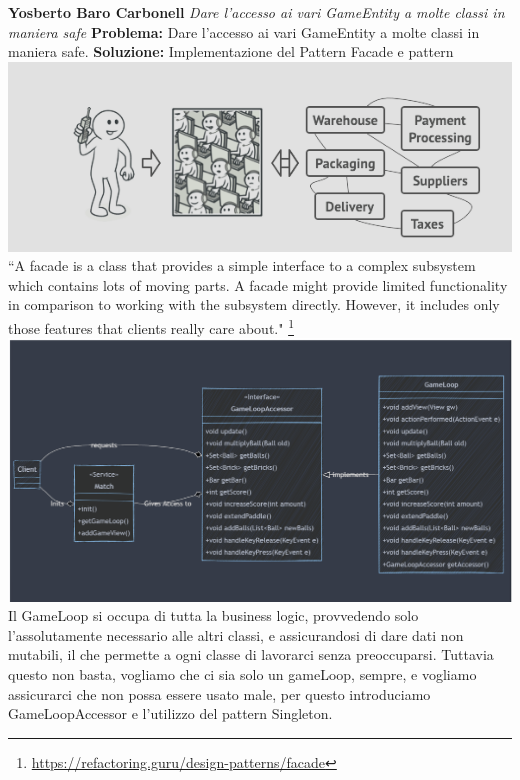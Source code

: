 \documentclass[a4paper,12pt]{report}
\begin{document}
\newline
\newline
\textbf{Yosberto Baro Carbonell}
\newline
\newline
\textit{Dare l’accesso ai vari GameEntity a molte classi in maniera safe}
\newline
\newline
\textbf{Problema:} Dare l’accesso ai vari GameEntity a molte classi in maniera safe.\newline
\textbf{Soluzione:} Implementazione del Pattern Facade e pattern \newline
\includegraphics[width=\textwidth]{facadeExample.png}
``A facade is a class that provides a simple interface to a complex subsystem which contains lots of moving parts. A facade might provide limited functionality in comparison to working with the subsystem directly. However, it includes only those features that clients really care about."\newline
\footnote{\href{https://refactoring.guru/design-patterns/facade}{https://refactoring.guru/design-patterns/facade}}
\includegraphics[width=\textwidth]{gameLoop.png}
Il GameLoop si occupa di tutta la business logic, provvedendo solo l’assolutamente necessario alle altri classi, e assicurandosi di dare dati non mutabili, il che permette a ogni classe di lavorarci senza preoccuparsi. Tuttavia questo non basta, vogliamo che ci sia solo un gameLoop, sempre, e vogliamo assicurarci che non possa essere usato male, per questo introduciamo GameLoopAccessor e l’utilizzo del pattern Singleton.
\end{document}
